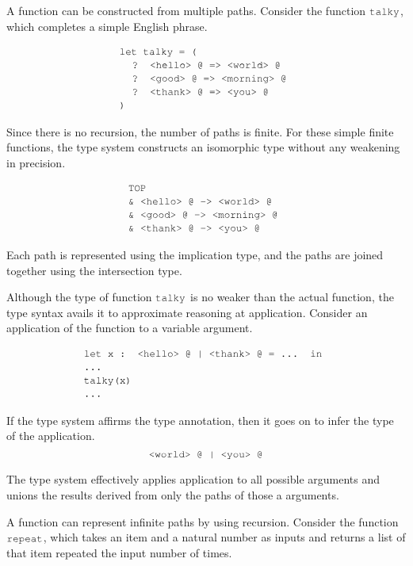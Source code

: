\documentclass[acmsmall]{acmart}
\theoremstyle{definition}
\begin{document}
A function can be constructed from multiple paths. 
Consider the function $\J{talky}$, which completes a simple English phrase.

\[
  \begin{array}[t]{@{} l}
    \J{let talky = (}
      \\
      \I \J{? <hello> @ => <world> @}
      \\
      \I \J{? <good> @ => <morning> @} 
      \\
      \I \J{? <thank> @ => <you> @} 
      \\
    \J{)}
  \end{array}
\]

Since there is no recursion, the number of paths is finite.
For these simple finite functions, the type system constructs
an isomorphic type without any weakening in precision. 

\[
  \begin{array}[t]{@{} l}
    \J{TOP}
      \\
      \J{\& <hello> @ -> <world> @}
      \\
      \J{\& <good> @ -> <morning> @} 
      \\
      \J{\& <thank> @ -> <you> @} 
  \end{array}
\]

Each path is represented using the implication type,
and the paths are joined together using the intersection type.

Although the type of function $\J{talky}$ is no weaker than the actual function,
the type syntax avails it to approximate reasoning at application.
Consider an application of the function to a variable argument. 

\[
  \begin{array}[t]{@{} l}
    \J{let x : <hello> @ | <thank> @ = ... in}
    \\
    \J{...}
    \\
    \J{talky(x)} 
    \\
    \J{...}
  \end{array}
\]

If the type system affirms the type annotation,
then it goes on to infer the type of the application. 
\[
  \J{<world> @ | <you> @}
\]

The type system effectively applies application to all possible arguments
and unions the results derived from only the paths of those a arguments. 

A function can represent infinite paths by using recursion.
Consider the function $\J{repeat}$, which takes an item and a natural number
as inputs and returns a list of that item repeated the input number of times.
\end{document}

